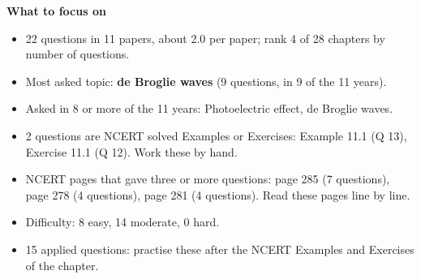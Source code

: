 \begin{minipage}[t]{0.63\linewidth}{\small\textbf{\color{crimson}What to focus on}\par\smallskip
\begin{itemize}[leftmargin=1.1em,itemsep=1pt,topsep=0pt]
\item 22 questions in 11 papers, about 2.0 per paper; rank 4 of 28 chapters by number of questions.
\item Most asked topic: \textbf{de Broglie waves} (9 questions, in 9 of the 11 years).
\item Asked in 8 or more of the 11 years: Photoelectric effect, de Broglie waves.
\item 2 questions are NCERT solved Examples or Exercises: Example 11.1 (Q 13), Exercise 11.1 (Q 12). Work these by hand.
\item NCERT pages that gave three or more questions: page 285 (7 questions), page 278 (4 questions), page 281 (4 questions). Read these pages line by line.
\item Difficulty: 8 easy, 14 moderate, 0 hard.
\item 15 applied questions: practise these after the NCERT Examples and Exercises of the chapter.
\end{itemize}}\end{minipage}\par
{}
